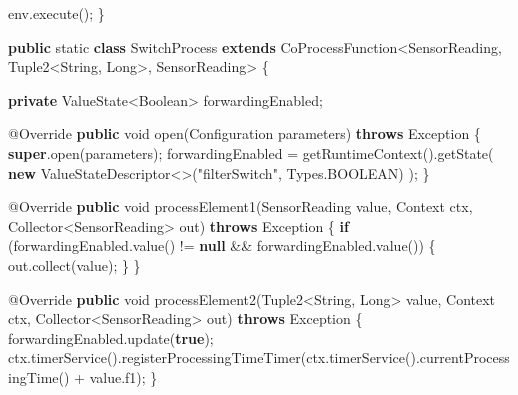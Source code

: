 \documentclass[cn,11pt,chinese]{elegantbook}
\newenvironment{Shaded}{}{}
\newcommand{\AttributeTok}[1]{\textcolor[rgb]{0.49,0.56,0.16}{#1}}
\newcommand{\BuiltInTok}[1]{#1}
\newcommand{\DataTypeTok}[1]{\textcolor[rgb]{0.56,0.13,0.00}{#1}}
\newcommand{\FunctionTok}[1]{\textcolor[rgb]{0.02,0.16,0.49}{#1}}
\newcommand{\KeywordTok}[1]{\textcolor[rgb]{0.00,0.44,0.13}{\textbf{#1}}}
\newcommand{\NormalTok}[1]{#1}
\newcommand{\StringTok}[1]{\textcolor[rgb]{0.25,0.44,0.63}{#1}}
\begin{document}
\begin{Shaded}
\begin{Highlighting}[]
\NormalTok{        env.}\FunctionTok{execute}\NormalTok{();}
\NormalTok{    \}}

    \KeywordTok{public} \DataTypeTok{static} \KeywordTok{class}\NormalTok{ SwitchProcess }\KeywordTok{extends}\NormalTok{ CoProcessFunction\textless{}SensorReading, Tuple2\textless{}}\BuiltInTok{String}\NormalTok{, }\BuiltInTok{Long}\NormalTok{\textgreater{}, SensorReading\textgreater{} \{}

        \KeywordTok{private}\NormalTok{ ValueState\textless{}}\BuiltInTok{Boolean}\NormalTok{\textgreater{} forwardingEnabled;}

        \AttributeTok{@Override}
        \KeywordTok{public} \DataTypeTok{void} \FunctionTok{open}\NormalTok{(}\BuiltInTok{Configuration}\NormalTok{ parameters) }\KeywordTok{throws} \BuiltInTok{Exception}\NormalTok{ \{}
            \KeywordTok{super}\NormalTok{.}\FunctionTok{open}\NormalTok{(parameters);}
\NormalTok{            forwardingEnabled = }\FunctionTok{getRuntimeContext}\NormalTok{().}\FunctionTok{getState}\NormalTok{(}
                    \KeywordTok{new}\NormalTok{ ValueStateDescriptor\textless{}\textgreater{}(}\StringTok{"filterSwitch"}\NormalTok{, }\BuiltInTok{Types}\NormalTok{.}\FunctionTok{BOOLEAN}\NormalTok{)}
\NormalTok{            );}
\NormalTok{        \}}

        \AttributeTok{@Override}
        \KeywordTok{public} \DataTypeTok{void} \FunctionTok{processElement1}\NormalTok{(SensorReading value, }\BuiltInTok{Context}\NormalTok{ ctx, Collector\textless{}SensorReading\textgreater{} out) }\KeywordTok{throws} \BuiltInTok{Exception}\NormalTok{ \{}
            \KeywordTok{if}\NormalTok{ (forwardingEnabled.}\FunctionTok{value}\NormalTok{() != }\KeywordTok{null}\NormalTok{ \&\& forwardingEnabled.}\FunctionTok{value}\NormalTok{()) \{}
\NormalTok{                out.}\FunctionTok{collect}\NormalTok{(value);}
\NormalTok{            \}}
\NormalTok{        \}}

        \AttributeTok{@Override}
        \KeywordTok{public} \DataTypeTok{void} \FunctionTok{processElement2}\NormalTok{(Tuple2\textless{}}\BuiltInTok{String}\NormalTok{, }\BuiltInTok{Long}\NormalTok{\textgreater{} value, }\BuiltInTok{Context}\NormalTok{ ctx, Collector\textless{}SensorReading\textgreater{} out) }\KeywordTok{throws} \BuiltInTok{Exception}\NormalTok{ \{}
\NormalTok{            forwardingEnabled.}\FunctionTok{update}\NormalTok{(}\KeywordTok{true}\NormalTok{);}
\NormalTok{            ctx.}\FunctionTok{timerService}\NormalTok{().}\FunctionTok{registerProcessingTimeTimer}\NormalTok{(ctx.}\FunctionTok{timerService}\NormalTok{().}\FunctionTok{currentProcessingTime}\NormalTok{() + value.}\FunctionTok{f1}\NormalTok{);}
\NormalTok{        \}}


\end{Highlighting}
\end{Shaded}
\end{document}
